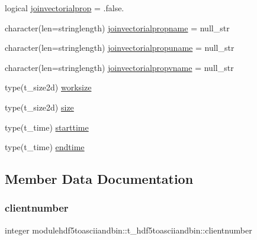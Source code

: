 \begin{DoxyCompactItemize}
\item 
logical \mbox{\hyperlink{structmodulehdf5toasciiandbin_1_1t__hdf5toasciiandbin_a4380bc5951b83ad35ff97ca1e032aa6e}{joinvectorialprop}} = .false.
\item 
character(len=stringlength) \mbox{\hyperlink{structmodulehdf5toasciiandbin_1_1t__hdf5toasciiandbin_affe4f0619b1c4cd40b286ac30ad91d73}{joinvectorialpropname}} = null\+\_\+str
\item 
character(len=stringlength) \mbox{\hyperlink{structmodulehdf5toasciiandbin_1_1t__hdf5toasciiandbin_a0601edd84350d2f6ed4e84cfd5270c33}{joinvectorialpropuname}} = null\+\_\+str
\item 
character(len=stringlength) \mbox{\hyperlink{structmodulehdf5toasciiandbin_1_1t__hdf5toasciiandbin_a3b122c69f1ca979a064295b6aacb2ab8}{joinvectorialpropvname}} = null\+\_\+str
\item 
type(t\+\_\+size2d) \mbox{\hyperlink{structmodulehdf5toasciiandbin_1_1t__hdf5toasciiandbin_a414940ec4ee0f6bbf97e018c28d06645}{worksize}}
\item 
type(t\+\_\+size2d) \mbox{\hyperlink{structmodulehdf5toasciiandbin_1_1t__hdf5toasciiandbin_ad090cd5421fc3cc69555a2931e895238}{size}}
\item 
type(t\+\_\+time) \mbox{\hyperlink{structmodulehdf5toasciiandbin_1_1t__hdf5toasciiandbin_ae34aeb6ef9430fa6014ff7a65aaf1799}{starttime}}
\item 
type(t\+\_\+time) \mbox{\hyperlink{structmodulehdf5toasciiandbin_1_1t__hdf5toasciiandbin_ae29fcf94a030a87fba2036eba43b2e67}{endtime}}
\end{DoxyCompactItemize}


\subsection{Member Data Documentation}
\mbox{\label{structmodulehdf5toasciiandbin_1_1t__hdf5toasciiandbin_a299a4e38f0e8bf1056e82644996b500a}} 
\subsubsection{\texorpdfstring{clientnumber}{clientnumber}}
{\footnotesize\ttfamily integer modulehdf5toasciiandbin\+::t\+\_\+hdf5toasciiandbin\+::clientnumber\hspace{0.3cm}{\ttfamily [private]}}

